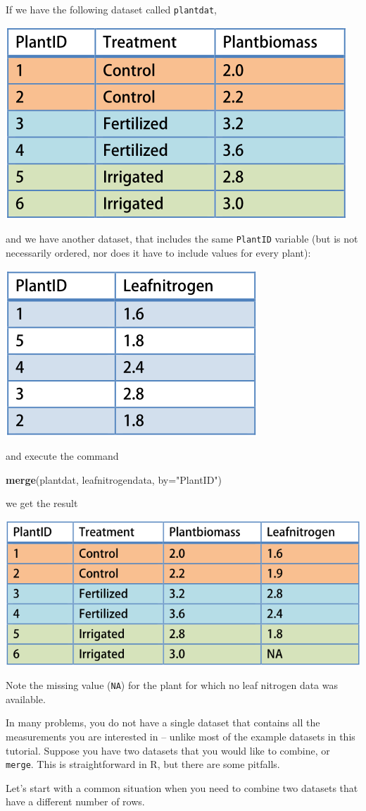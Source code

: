 \documentclass[]{book}
\newenvironment{Shaded}{\begin{snugshade}}{\end{snugshade}}
\newcommand{\DataTypeTok}[1]{\textcolor[rgb]{0.13,0.29,0.53}{#1}}
\newcommand{\KeywordTok}[1]{\textcolor[rgb]{0.13,0.29,0.53}{\textbf{#1}}}
\newcommand{\NormalTok}[1]{#1}
\newcommand{\StringTok}[1]{\textcolor[rgb]{0.31,0.60,0.02}{#1}}
\begin{document}
If we have the following dataset called \texttt{plantdat},

\includegraphics[width=0.33\linewidth]{screenshots/exampledata}

and we have another dataset, that includes the same \texttt{PlantID} variable (but is not necessarily ordered, nor does it have to include values for every plant):

\includegraphics[width=0.33\linewidth]{screenshots/leafnitrogendata}

and execute the command

\begin{Shaded}
\begin{Highlighting}[]
\KeywordTok{merge}\NormalTok{(plantdat, leafnitrogendata, }\DataTypeTok{by=}\StringTok{"PlantID"}\NormalTok{)}
\end{Highlighting}
\end{Shaded}

we get the result

\includegraphics[width=0.33\linewidth]{screenshots/mergeresult}

Note the missing value (\texttt{NA}) for the plant for which no leaf nitrogen data was available.

In many problems, you do not have a single dataset that contains all the measurements you are interested in -- unlike most of the example datasets in this tutorial. Suppose you have two datasets that you would like to combine, or \texttt{merge}. This is straightforward in R, but there are some pitfalls.

Let's start with a common situation when you need to combine two datasets that have a different number of rows.
\end{document}
